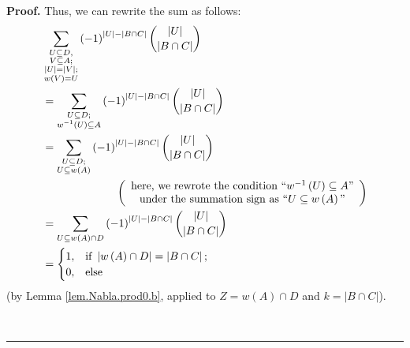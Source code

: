 \documentclass[numbers=enddot,12pt,final,onecolumn,notitlepage]{scrartcl}%
\providecommand{\U}[1]{\protect\rule{.1in}{.1in}}
\numberwithin{exer}{subsection}
\theoremstyle{definition}
\newenvironment{proof}[1][Proof]{\noindent\textbf{#1.} }{\ \rule{0.5em}{0.5em}}
\let\sumnonlimits\sum
\renewcommand{\sum}{\sumnonlimits\limits}
\begin{document}
\begin{proof}
Thus, we can rewrite the sum as follows:%
\begin{align}
&  \sum_{\substack{U\subseteq D,\\V\subseteq A;\\\left\vert U\right\vert
=\left\vert V\right\vert ;\\w\left(  V\right)  =U}}\left(  -1\right)
^{\left\vert U\right\vert -\left\vert B\cap C\right\vert }\dbinom{\left\vert
U\right\vert }{\left\vert B\cap C\right\vert }\nonumber\\
&  =\sum_{\substack{U\subseteq D;\\w^{-1}\left(  U\right)  \subseteq
A}}\left(  -1\right)  ^{\left\vert U\right\vert -\left\vert B\cap C\right\vert
}\dbinom{\left\vert U\right\vert }{\left\vert B\cap C\right\vert }\nonumber\\
&  =\sum_{\substack{U\subseteq D;\\U\subseteq w\left(  A\right)  }}\left(
-1\right)  ^{\left\vert U\right\vert -\left\vert B\cap C\right\vert }%
\dbinom{\left\vert U\right\vert }{\left\vert B\cap C\right\vert }\nonumber\\
&  \ \ \ \ \ \ \ \ \ \ \ \ \ \ \ \ \ \ \ \ \left(
\begin{array}
[c]{c}%
\text{here, we rewrote the condition \textquotedblleft}w^{-1}\left(  U\right)
\subseteq A\text{\textquotedblright}\\
\text{under the summation sign as \textquotedblleft}U\subseteq w\left(
A\right)  \text{\textquotedblright}%
\end{array}
\right) \nonumber\\
&  =\sum_{U\subseteq w\left(  A\right)  \cap D}\left(  -1\right)  ^{\left\vert
U\right\vert -\left\vert B\cap C\right\vert }\dbinom{\left\vert U\right\vert
}{\left\vert B\cap C\right\vert }\nonumber\\
&  =%
\begin{cases}
1, & \text{if }\left\vert w\left(  A\right)  \cap D\right\vert =\left\vert
B\cap C\right\vert ;\\
0, & \text{else}%
\end{cases}
\label{pf.thm.Nabla.prod0.c.2}%
\end{align}
(by Lemma \ref{lem.Nabla.prod0.b}, applied to $Z=w\left(  A\right)  \cap D$
and $k=\left\vert B\cap C\right\vert $).


\end{proof}
\end{document}
